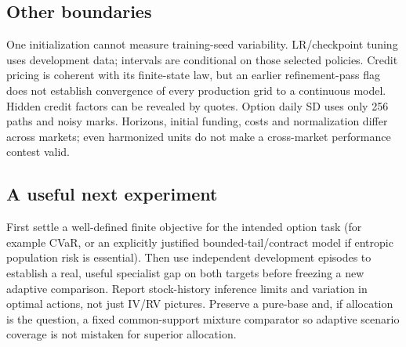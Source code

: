 \documentclass[11pt,a4paper]{article}
\begin{document}
\subsection*{Other boundaries}
One initialization cannot measure training-seed variability. LR/checkpoint tuning uses development data; intervals are conditional on those selected policies. Credit pricing is coherent with its finite-state law, but an earlier refinement-pass flag does not establish convergence of every production grid to a continuous model. Hidden credit factors can be revealed by quotes. Option daily SD uses only 256 paths and noisy marks. Horizons, initial funding, costs and normalization differ across markets; even harmonized units do not make a cross-market performance contest valid.

\subsection*{A useful next experiment}
First settle a well-defined finite objective for the intended option task (for example CVaR, or an explicitly justified bounded-tail/contract model if entropic population risk is essential). Then use independent development episodes to establish a real, useful specialist gap on both targets before freezing a new adaptive comparison. Report stock-history inference limits and variation in optimal actions, not just IV/RV pictures. Preserve a pure-base and, if allocation is the question, a fixed common-support mixture comparator so adaptive scenario coverage is not mistaken for superior allocation.

\clearpage
\end{document}
